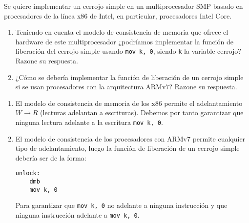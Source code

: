 \begin{ejercicio}
    Se quiere implementar un cerrojo simple en un multiprocesador SMP basado en procesadores de la línea x86 de Intel, en particular, procesadores Intel Core. 
    \begin{enumerate}
        \item Teniendo en cuenta el modelo de consistencia de memoria que ofrece el hardware de este multiprocesador ¿podríamos implementar la función de liberación del cerrojo simple usando \verb|mov k, 0|, siendo \verb|k| la variable cerrojo? Razone su respuesta.
        \item ¿Cómo se debería implementar la función de liberación de un cerrojo simple si se usan procesadores con la arquitectura ARMv7? Razone su respuesta.
    \end{enumerate}

    \begin{enumerate}
        \item El modelo de consistencia de memoria de los x86 permite el adelantamiento $W\rightarrow R$ (lecturas adelantan a escrituras). Debemos por tanto garantizar que ninguna lectura adelante a la escritura \verb|mov k, 0|.
        \item El modelo de consistencia de los procesadores con ARMv7 permite cualquier tipo de adelantamiento, luego la función de liberación de un cerrojo simple debería ser de la forma:
            \begin{listing}[H]
            \begin{verbatim}
unlock:
    dmb
    mov k, 0
            \end{verbatim}
            \end{listing}
        Para garantizar que \verb|mov k, 0| no adelante a ninguna instrucción y que ninguna instrucción adelante a \verb|mov k, 0|.
    \end{enumerate}
\end{ejercicio}

